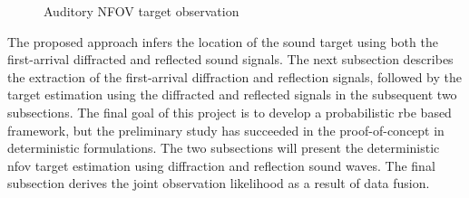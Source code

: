 \documentclass[letterpaper, 10 pt, conference]{ieeeconf}  %
\begin{document}
\begin{figure}[ht]
    \centering
    \caption{Auditory NFOV target observation}
    \label{fig:auditory_approach}
\end{figure}

The proposed approach infers the location of the sound target using both the first-arrival diffracted and reflected sound signals.  The next subsection describes the extraction of the first-arrival diffraction and reflection signals, followed by the target estimation using the diffracted and reflected signals in the subsequent two subsections.  The final goal of this project is to develop a probabilistic \gls{rbe} based framework, but the preliminary study has succeeded in the proof-of-concept in deterministic formulations.  The two subsections will present the deterministic \gls{nfov} target estimation using diffraction and reflection sound waves.  The final subsection derives the joint observation likelihood as a result of data fusion.  
\end{document}
